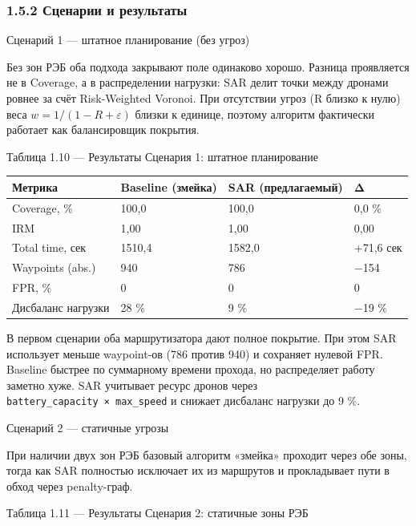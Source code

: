 \documentclass[14pt,a4paper]{extarticle}
\begin{document}
\hypertarget{ux441ux446ux435ux43dux430ux440ux438ux438-ux438-ux440ux435ux437ux443ux43bux44cux442ux430ux442ux44b}{%
\subsubsection{1.5.2 Сценарии и результаты}\label{ux441ux446ux435ux43dux430ux440ux438ux438-ux438-ux440ux435ux437ux443ux43bux44cux442ux430ux442ux44b}}

Сценарий 1 --- штатное планирование (без угроз)

Без зон РЭБ оба подхода закрывают поле одинаково хорошо. Разница проявляется не в Coverage, а в распределении нагрузки: SAR делит точки между дронами ровнее за счёт Risk-Weighted Voronoi. При отсутствии угроз (R близко к нулю) веса \(w = 1/(1-R+\varepsilon)\) близки к единице, поэтому алгоритм фактически работает как балансировщик покрытия.

Таблица 1.10 --- Результаты Сценария 1: штатное планирование

\begin{longtable}[]{@{}llll@{}}
\toprule\noalign{}
Метрика & Baseline (змейка) & SAR (предлагаемый) & Δ \\
\midrule\noalign{}
\endhead
\bottomrule\noalign{}
\endlastfoot
Coverage, \% & 100,0 & 100,0 & 0,0 \% \\
IRM & 1,00 & 1,00 & 0,00 \\
Total time, сек & 1510,4 & 1582,0 & +71,6 сек \\
Waypoints (abs.) & 940 & 786 & −154 \\
FPR, \% & 0 & 0 & 0 \\
Дисбаланс нагрузки & 28 \% & 9 \% & −19 \% \\
\end{longtable}

В первом сценарии оба маршрутизатора дают полное покрытие. При этом SAR использует меньше waypoint-ов (786 против 940) и сохраняет нулевой FPR. Baseline быстрее по суммарному времени прохода, но распределяет работу заметно хуже. SAR учитывает ресурс дронов через \texttt{battery\_capacity\ ×\ max\_speed} и снижает дисбаланс нагрузки до 9 \%.

Сценарий 2 --- статичные угрозы

При наличии двух зон РЭБ базовый алгоритм «змейка» проходит через обе зоны, тогда как SAR полностью исключает их из маршрутов и прокладывает пути в обход через penalty-граф.

Таблица 1.11 --- Результаты Сценария 2: статичные зоны РЭБ
\end{document}
